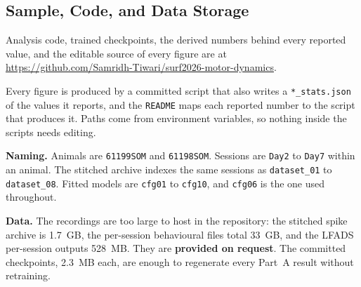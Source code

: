 \documentclass[11pt]{article}
\begin{document}
\subsection{Sample, Code, and Data Storage}

Analysis code, trained checkpoints, the derived numbers behind every reported
value, and the editable source of every figure are at\\
\url{https://github.com/Samridh-Tiwari/surf2026-motor-dynamics}.

Every figure is produced by a committed script that also writes a
\texttt{*\_stats.json} of the values it reports, and the \texttt{README} maps
each reported number to the script that produces it. Paths come from environment
variables, so nothing inside the scripts needs editing.

\textbf{Naming.} Animals are \texttt{61199SOM} and \texttt{61198SOM}. Sessions
are \texttt{Day2} to \texttt{Day7} within an animal. The stitched archive indexes
the same sessions as \texttt{dataset\_01} to \texttt{dataset\_08}. Fitted models
are \texttt{cfg01} to \texttt{cfg10}, and \texttt{cfg06} is the one used
throughout.

\textbf{Data.} The recordings are too large to host in the repository: the
stitched spike archive is 1.7~GB, the per-session behavioural files total 33~GB,
and the LFADS per-session outputs 528~MB. They are \textbf{provided on request}.
The committed checkpoints, 2.3~MB each, are enough to regenerate every Part~A
result without retraining.
\end{document}
